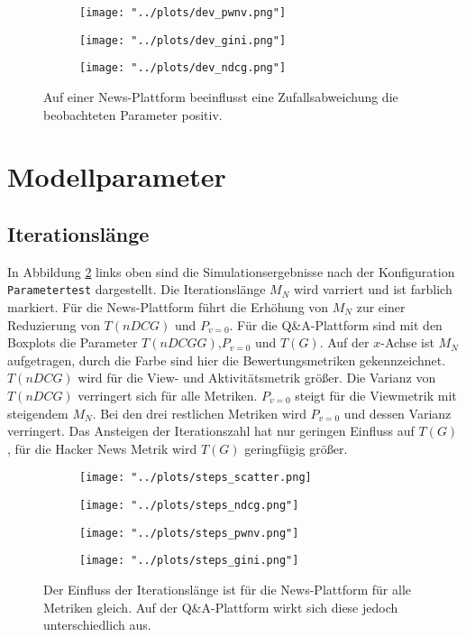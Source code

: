 \begin{figure}[!h]
	\begin{subfigure}{0.5\textwidth}
		\texttt{[image: "../plots/dev\_pwnv.png"]}
	\end{subfigure}
	\begin{subfigure}{0.5\textwidth}
		\texttt{[image: "../plots/dev\_gini.png"]}
	\end{subfigure}
	\begin{subfigure}{0.5\textwidth}
		\texttt{[image: "../plots/dev\_ndcg.png"]}
	\end{subfigure}
	\caption{Auf einer News-Plattform beeinflusst eine Zufallsabweichung die beobachteten Parameter positiv.}
	\label{fig:zufall}	
\end{figure}


\section{Modellparameter}

\subsection{Iterationslänge}

In Abbildung \ref{fig:steps} links oben sind die Simulationsergebnisse nach der Konfiguration \texttt{Parametertest} dargestellt. Die Iterationslänge $M_N$ wird varriert und ist farblich markiert. Für die News-Plattform führt die Erhöhung von $M_N$ zur einer Reduzierung von $T(nDCG)$ und $P_{v=0}$. Für die Q\&A-Plattform sind mit den Boxplots die Parameter $T(nDCGG)$,$P_{v=0}$ und $T(G)$. Auf der $x$-Achse ist $M_N$ aufgetragen, durch die Farbe sind hier die Bewertungsmetriken gekennzeichnet. $T(nDCG)$ wird für die View- und Aktivitätsmetrik größer. Die Varianz von $T(nDCG)$ verringert sich für alle Metriken. $P_{v=0}$ steigt für die Viewmetrik mit steigendem $M_N$. Bei den drei restlichen Metriken wird $P_{v=0}$ und dessen Varianz verringert. Das Ansteigen der Iterationszahl hat nur geringen Einfluss auf $T(G)$, für die Hacker News Metrik wird $T(G)$ geringfügig größer. 


\begin{figure}[!htb]
	\begin{subfigure}{0.5\textwidth}
		\texttt{[image: "../plots/steps\_scatter.png]}%
	\end{subfigure}
	\hfill
	\begin{subfigure}{0.5\textwidth}
		\texttt{[image: "../plots/steps\_ndcg.png"]}%
	\end{subfigure}
	\begin{subfigure}{0.5\textwidth}
		\texttt{[image: "../plots/steps\_pwnv.png"]}%
	\end{subfigure}
	\hfill
	\begin{subfigure}{0.5\textwidth}
		\texttt{[image: "../plots/steps\_gini.png"]}%
	\end{subfigure}
	\caption{Der Einfluss der Iterationslänge ist für die News-Plattform für alle Metriken gleich. Auf der Q\&A-Plattform wirkt sich diese jedoch unterschiedlich aus.}
	\label{fig:steps}
\end{figure}

